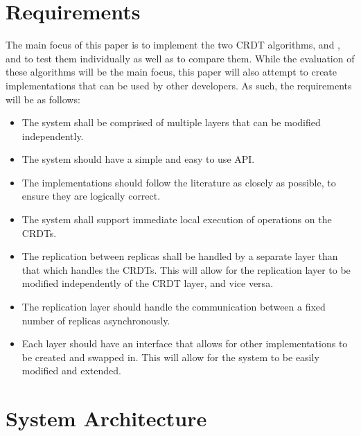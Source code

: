 \documentclass[12pt]{report}
\begin{document}
\section{Requirements}
The main focus of this paper is to implement the two CRDT algorithms, \cite{9563274} and \cite{https://doi.org/10.48550/arxiv.2103.04828}, and to test them individually as well as to compare them. While the evaluation of these algorithms will be the main focus, this paper will also attempt to create implementations that can be used by other developers. As such, the requirements will be as follows:
\begin{itemize}
    \item The system shall be comprised of multiple layers that can be modified independently.
    \item The system should have a simple and easy to use API.
    \item The implementations should follow the literature as closely as possible, to ensure they are logically correct.
    \item The system shall support immediate local execution of operations on the CRDTs.
    \item The replication between replicas shall be handled by a separate layer than that which handles the CRDTs. This will allow for the replication layer to be modified independently of the CRDT layer, and vice versa.
    \item The replication layer should handle the communication between a fixed number of replicas asynchronously.
    \item Each layer should have an interface that allows for other implementations to be created and swapped in. This will allow for the system to be easily modified and extended.
\end{itemize}


\section{System Architecture}\label{sec:architecture}
\end{document}

